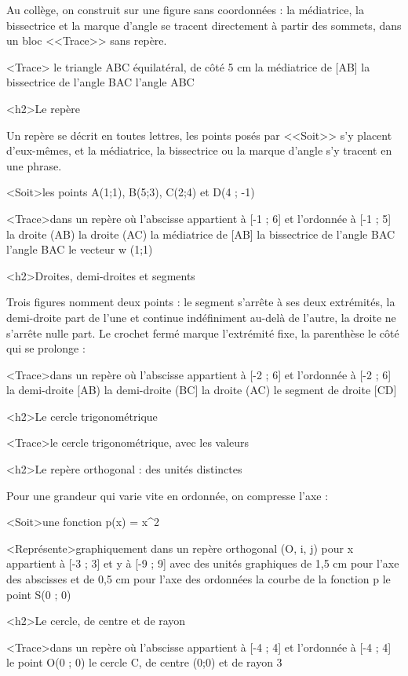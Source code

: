 \documentclass[marges=20, taille=11]{texecole}
\begin{document}
Au collège, on construit sur une figure sans coordonnées : la médiatrice, la bissectrice et la marque d'angle se tracent directement à partir des sommets, dans un bloc <<Trace>> sans repère.

<Trace>{
	le triangle ABC équilatéral, de côté 5 cm
	la médiatrice de [AB]
	la bissectrice de l'angle BAC
	l'angle ABC
}

<h2>Le repère

Un repère se décrit en toutes lettres, les points posés par <<Soit>> s'y placent d'eux-mêmes, et la médiatrice, la bissectrice ou la marque d'angle s'y tracent en une phrase.

<Soit>les points A(1;1), B(5;3), C(2;4) et D(4 ; -1)

<Trace>dans un repère où l'abscisse appartient à [-1 ; 6] et l'ordonnée à [-1 ; 5] {
	la droite (AB)
	la droite (AC)
	la médiatrice de [AB]
	la bissectrice de l'angle BAC
	l'angle BAC
	le vecteur w (1;1)
}

<h2>Droites, demi-droites et segments

Trois figures nomment deux points : le segment s'arrête à ses deux extrémités, la demi-droite part de l'une et continue indéfiniment au-delà de l'autre, la droite ne s'arrête nulle part. Le crochet fermé marque l'extrémité fixe, la parenthèse le côté qui se prolonge :

<Trace>dans un repère où l'abscisse appartient à [-2 ; 6] et l'ordonnée à [-2 ; 6] {
	la demi-droite [AB)
	la demi-droite (BC]
	la droite (AC)
	le segment de droite [CD]
}

<h2>Le cercle trigonométrique

<Trace>le cercle trigonométrique, avec les valeurs

<h2>Le repère orthogonal : des unités distinctes

Pour une grandeur qui varie vite en ordonnée, on compresse l'axe :

<Soit>une fonction p(x) = x^2

<Représente>graphiquement dans un repère orthogonal (O, i, j) pour x appartient à [-3 ; 3] et y à [-9 ; 9] avec des unités graphiques de 1,5 cm pour l'axe des abscisses et de 0,5 cm pour l'axe des ordonnées {
	la courbe de la fonction p
	le point S(0 ; 0)
}

<h2>Le cercle, de centre et de rayon

<Trace>dans un repère où l'abscisse appartient à [-4 ; 4] et l'ordonnée à [-4 ; 4] {
	le point O(0 ; 0)
	le cercle C, de centre (0;0) et de rayon 3
}
\end{document}

